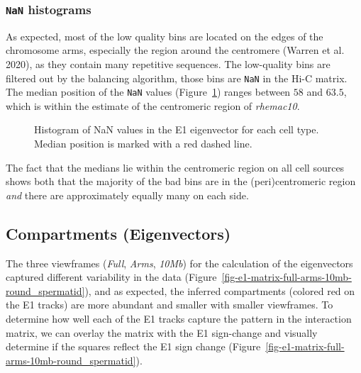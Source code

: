 \documentclass[
  11pt,
  a4paper,
]{scrbook}
\let\oldemph\emph
\renewcommand\emph[1]{\oldemph{\color{gray}#1}}
\begin{document}
\subsubsection{\texorpdfstring{\texttt{NaN}
histograms}{NaN histograms}}\label{nan-histograms}

As expected, most of the low quality bins are located on the edges of
the chromosome arms, especially the region around the centromere (Warren
et al. 2020), as they contain many repetitive sequences. The low-quality
bins are filtered out by the balancing algorithm, those bins are
\texttt{NaN} in the Hi-C matrix. The median position of the \texttt{NaN}
values (Figure~\ref{fig-e1_nan_hist}) ranges between \(58\) and
\(63.5\), which is within the estimate of the centromeric region of
\emph{rhemac10}.

\begin{figure}[H]


\caption{\label{fig-e1_nan_hist}Histogram of NaN values in the E1
eigenvector for each cell type. Median position is marked with a red
dashed line.}

\end{figure}%

The fact that the medians lie within the centromeric region on all cell
sources shows both that the majority of the bad bins are in the
(peri)centromeric region \emph{and} there are approximately equally many
on each side.

\subsection{Compartments (Eigenvectors)}\label{sec-results-eigenvectors}

The three viewframes (\emph{Full}, \emph{Arms}, \emph{10Mb}) for the
calculation of the eigenvectors captured different variability in the
data (Figure~\ref{fig-e1-matrix-full-arms-10mb-round_spermatid}), and as
expected, the inferred compartments (colored red on the E1 tracks) are
more abundant and smaller with smaller viewframes. To determine how well
each of the E1 tracks capture the pattern in the interaction matrix, we
can overlay the matrix with the E1 sign-change and visually determine if
the squares reflect the E1 sign change
(Figure~\ref{fig-e1-matrix-full-arms-10mb-round_spermatid}).
\end{document}
